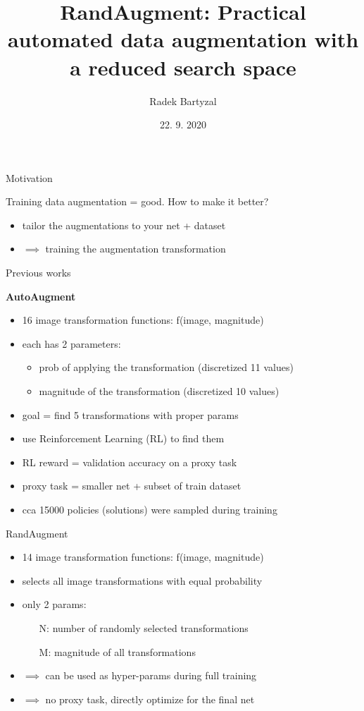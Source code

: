 \documentclass{beamer}
\begin{document}
\title[BigBird]{RandAugment: Practical automated data augmentation with a reduced search space}  
\author{Radek Bartyzal}
\date{22. 9. 2020} 

\frame{\titlepage} 

\begin{frame}{Motivation}

Training data augmentation = good.
\vfill
How to make it better?

\begin{itemize}
\item tailor the augmentations to your net + dataset
\item $\implies$ training the augmentation transformation 
\end{itemize}

\end{frame}
\begin{frame}{Previous works}

\textbf{AutoAugment} \cite{cit:auto}
\begin{itemize}
\item 16 image transformation functions: f(image, magnitude)
\item each has 2 parameters:
\begin{itemize}
\item prob of applying the transformation (discretized 11 values)
\item magnitude of the transformation (discretized 10 values)
\end{itemize}
\item goal = find 5 transformations with proper params
\item use Reinforcement Learning (RL) to find them
\item RL reward = validation accuracy on a proxy task
\item proxy task = smaller net + subset of train dataset
\item cca 15000 policies (solutions) were sampled during training
\end{itemize}
\end{frame}
\begin{frame}{RandAugment}

\begin{itemize}
\item 14 image transformation functions: f(image, magnitude)
\item selects all image transformations with
equal probability
\item only 2 params:
\begin{itemize}
\item[N:] number of randomly selected transformations
\item[M:] magnitude of all transformations
\end{itemize}
\item $\implies$ can be used as hyper-params during full training
\item $\implies$ no proxy task, directly optimize for the final net
\end{itemize}


\end{frame}
\end{document}
